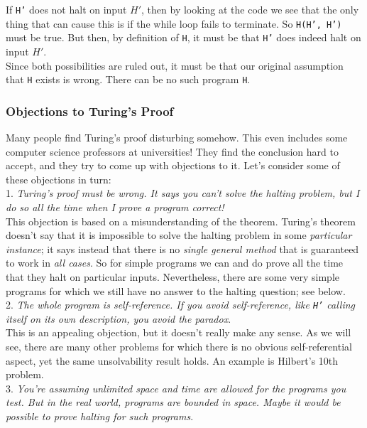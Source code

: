 \documentclass[12pt]{article}
\theoremstyle{plain}
\theoremstyle{definition}
\begin{document}
If \texttt{H'} does not halt on input $H'$, then by looking at the code we see that the only thing that can cause this is if the while loop fails to terminate.
So \texttt{H(H', H')} must be true.
But then, by definition of \texttt{H}, it must be that \texttt{H'} does indeed halt on input $H'$. \\

Since both possibilities are ruled out, it must be that our original assumption that \texttt{H} exists is wrong.
There can be no such program \texttt{H}.

\subsubsection{Objections to Turing's Proof}
Many people find Turing's proof disturbing somehow. This even includes some computer science professors at universities!
They find the conclusion hard to accept, and they try to come up with objections to it.
Let's consider some of these objections in turn: \\

1. \emph{Turing's proof must be wrong. It says you can't solve the halting problem, but I do so all the time when I prove a program correct!} \\

This objection is based on a misunderstanding of the theorem.
Turing's theorem doesn't say that it is impossible to solve the halting problem in some \emph{particular instance};
it says instead that there is no \emph{single general method} that is guaranteed to work in \emph{all cases}.
So for simple programs we can and do prove all the time that they halt on particular inputs.
Nevertheless, there are some very simple programs for which we still have no answer to the halting question;
see below. \\

2. \emph{The whole program is self-reference. If you avoid self-reference, like \texttt{H'} calling itself on its own description, you avoid the paradox}. \\

This is an appealing objection, but it doesn't really make any sense.
As we will see, there are many other problems for which there is no obvious self-referential aspect, yet the same unsolvability result holds.
An example is Hilbert's 10th problem. \\

3. \emph{You're assuming unlimited space and time are allowed for the programs you test. But in the real world, programs are bounded in space. Maybe it would be possible to prove halting for such programs}. \\
\end{document}
